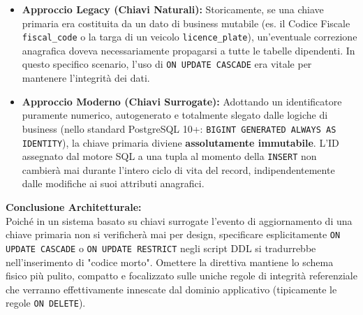 \begin{itemize}
    \item \textbf{Approccio Legacy (Chiavi Naturali):} Storicamente, se una chiave primaria era costituita da un dato di business mutabile (es. il Codice Fiscale \texttt{fiscal\_code} o la targa di un veicolo \texttt{licence\_plate}), un'eventuale correzione anagrafica doveva necessariamente propagarsi a tutte le tabelle dipendenti. In questo specifico scenario, l'uso di \texttt{ON UPDATE CASCADE} era vitale per mantenere l'integrit\`a dei dati.
    
    \item \textbf{Approccio Moderno (Chiavi Surrogate):} Adottando un identificatore puramente numerico, autogenerato e totalmente slegato dalle logiche di business (nello standard PostgreSQL 10+: \texttt{BIGINT GENERATED ALWAYS AS IDENTITY}), la chiave primaria diviene \textbf{assolutamente immutabile}. L'ID assegnato dal motore SQL a una tupla al momento della \texttt{INSERT} non cambier\`a mai durante l'intero ciclo di vita del record, indipendentemente dalle modifiche ai suoi attributi anagrafici.
\end{itemize}

\textbf{Conclusione Architetturale:}\\
Poich\'e in un sistema basato su chiavi surrogate l'evento di aggiornamento di una chiave primaria non si verificher\`a mai per design, specificare esplicitamente \texttt{ON UPDATE CASCADE} o \texttt{ON UPDATE RESTRICT} negli script DDL si tradurrebbe nell'inserimento di "codice morto". Omettere la direttiva mantiene lo schema fisico pi\`u pulito, compatto e focalizzato sulle uniche regole di integrit\`a referenziale che verranno effettivamente innescate dal dominio applicativo (tipicamente le regole \texttt{ON DELETE}).








